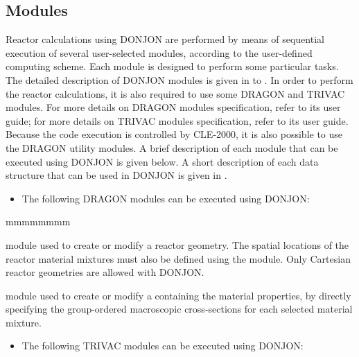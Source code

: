 \subsection{Modules}\label{sect:mod}

\vskip 0.2cm
Reactor calculations using DONJON are performed by means of
sequential execution of several user-selected modules, according to the
user-defined computing scheme.
Each module is designed to perform some particular tasks.
The detailed description of DONJON modules is given in 
to .
In order to perform the reactor calculations, it is also
required to use some DRAGON and TRIVAC modules.
For more details on DRAGON modules specification, refer to its user
guide\cite{dragon}; for more details on TRIVAC modules
specification, refer to its user guide\cite{trivac}.
Because the code execution is controlled by CLE-2000,
it is also possible to use the DRAGON utility modules\cite{cle2000,dragon}.
A brief description
of each module that can be executed using DONJON is given below.
A short description of each data structure that can be used in DONJON
is given in .\\

\vskip 0.2cm
\begin{itemize}
\item  The following DRAGON modules can be executed using DONJON:
\end{itemize}

\vskip 0.2cm
\begin{ListeDeDescription}{mmmmmmmm}

\item[\moc{GEO:}] module used to create or modify a reactor geometry.
The spatial locations of the reactor material mixtures must also be defined
using the  module. Only  Cartesian reactor geometries
are allowed with DONJON.

\item[\moc{MAC:}] module used to create or modify a 
containing the material properties, by directly specifying the group-ordered
macroscopic cross-sections for each selected material mixture.

\end{ListeDeDescription}

\vskip 0.2cm
\begin{itemize}
\item  The following TRIVAC modules can be executed using DONJON:
\end{itemize}

